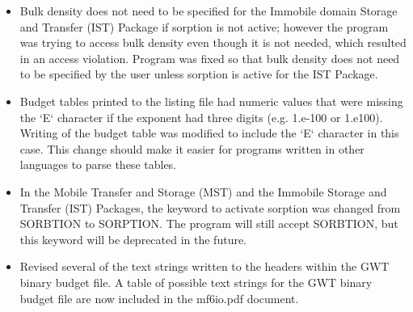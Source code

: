 \begin{itemize}
	        \item Bulk density does not need to be specified for the Immobile domain Storage and Transfer (IST) Package if sorption is not active; however the program was trying to access bulk density even though it is not needed, which resulted in an access violation.  Program was fixed so that bulk density does not need to be specified by the user unless sorption is active for the IST Package.
	        \item Budget tables printed to the listing file had numeric values that were missing the `E` character if the exponent had three digits (e.g. 1.e-100 or 1.e100).  Writing of the budget table was modified to include the `E` character in this case.  This change should make it easier for programs written in other languages to parse these tables.
	        \item In the Mobile Transfer and Storage (MST) and the Immobile Storage and Transfer (IST) Packages, the keyword to activate sorption was changed from SORBTION to SORPTION.  The program will still accept SORBTION, but this keyword will be deprecated in the future.
	        \item Revised several of the text strings written to the headers within the GWT binary budget file.  A table of possible text strings for the GWT binary budget file are now included in the mf6io.pdf document.
	\end{itemize}


